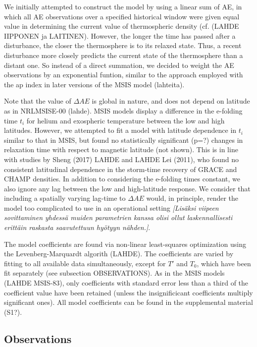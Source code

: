 \documentclass[referee,a4paper,12pt,traditabstract]{swsc}
\begin{document}
\begin{linenumbers}
We initially attempted to construct the model by using a linear sum of AE, in which all AE observations over a specified historical window were given equal value in determining the current value of thermospheric density (cf. (LAHDE IIPPONEN ja LAITINEN). However, the longer the time has passed after a disturbance, the closer the thermosphere is to its relaxed state. Thus, a recent disturbance more closely predicts the current state of the thermosphere than a distant one. So instead of a direct summation, we decided to weight the AE observations by an exponential funtion, similar to the approach employed with the ap index in later versions of the MSIS model (lahteita). 

Note that the value of $\Delta AE$ is global in nature, and does not depend on latitude as in NRLMSISE-00 (lahde). MSIS models display a difference in the e-folding time $t_i$ for helium and exospheric temperature between the low and high latitudes. However, we attempted to fit a model with latitude dependence in $t_i$ similar to that in MSIS, but found no statistically significant (p=?) changes in relaxation time with respect to magnetic latitude (not shown). This is in line with studies by Sheng (2017) LAHDE and LAHDE Lei (2011), who found no consistent latitudinal dependence in the storm-time recovery of GRACE and CHAMP densities. In addition to considering the e-folding times constant, we also ignore any lag between the low and high-latitude response. We consider that including a spatially varying lag-time to $\Delta AE$ would, in principle, render the model too complicated to use in an operational setting \textit{[Lis\"aksi viipeen sovittaminen yhdess\"a muiden parametrien kanssa olisi ollut laskennallisesti eritt\"ain raskasta saavutettuun hy\"otyyn n\"ahden.]}.

The model coefficients are found via non-linear least-squares optimization using the Levenberg-Marquardt algorith (LAHDE). The coefficients are varied by fitting to all available data simultaneously, except for $T'$ and $T_0$, which have been fit separately (see subsection OBSERVATIONS). As in the MSIS models (LAHDE MSIS-83), only coefficients with standard error less than a third of the coefficient value have been retained (unless the insignificicant coefficients multiply significant ones). All model coefficients can be found in the supplemental material (S1?). 

\subsection{Observations}


\end{linenumbers}
\end{document}

